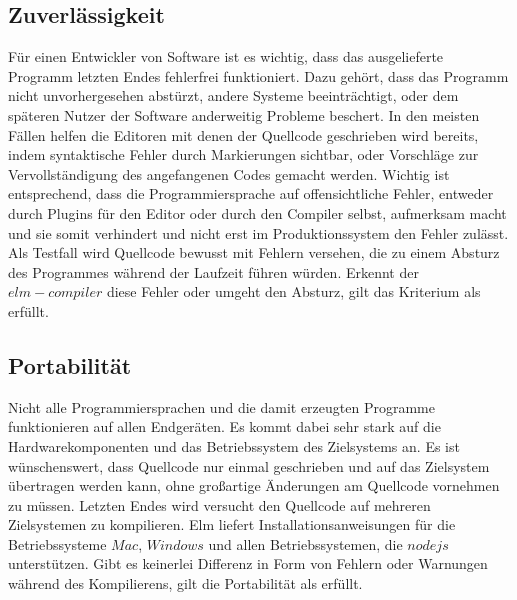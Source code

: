 \subsection{Zuverlässigkeit}
\label{sec:Zuverlässigkeit}
Für einen Entwickler von Software ist es wichtig, dass das ausgelieferte Programm letzten Endes fehlerfrei funktioniert. Dazu gehört, dass das Programm nicht unvorhergesehen abstürzt, andere Systeme beeinträchtigt, oder dem späteren Nutzer der Software anderweitig Probleme beschert. In den meisten Fällen helfen die Editoren mit denen der Quellcode geschrieben wird bereits, indem syntaktische Fehler durch Markierungen sichtbar, oder Vorschläge zur Vervollständigung des angefangenen Codes gemacht werden. Wichtig ist entsprechend, dass die Programmiersprache auf offensichtliche Fehler, entweder durch Plugins für den Editor oder durch den Compiler selbst, aufmerksam macht und sie somit verhindert und nicht erst im Produktionssystem den Fehler zulässt. Als Testfall wird Quellcode bewusst mit Fehlern versehen, die zu einem Absturz des Programmes während der Laufzeit führen würden. Erkennt der $elm-compiler$ diese Fehler oder umgeht den Absturz, gilt das Kriterium als erfüllt.


\subsection{Portabilität}
\label{sec:Portabilität}
Nicht alle Programmiersprachen und die damit erzeugten Programme funktionieren auf allen Endgeräten. Es kommt dabei sehr stark auf die Hardwarekomponenten und das Betriebssystem des Zielsystems an. Es ist wünschenswert, dass Quellcode nur einmal geschrieben und auf das Zielsystem übertragen werden kann, ohne großartige Änderungen am Quellcode vornehmen zu müssen. Letzten Endes wird versucht den Quellcode auf mehreren Zielsystemen zu kompilieren. Elm liefert Installationsanweisungen für die Betriebssysteme $Mac$, $Windows$ und allen Betriebssystemen, die $nodejs$ unterstützen. Gibt es keinerlei Differenz in Form von Fehlern oder Warnungen während des Kompilierens, gilt die Portabilität als erfüllt.


